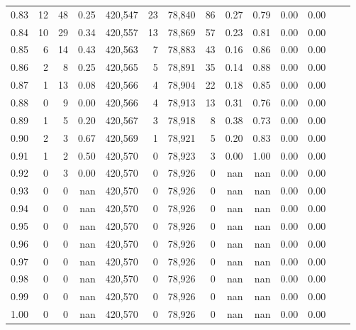 \begin{tabular}{rrrrrrrrrrrrrr}
0.83 &      12 &     48 &    0.25 &  420,547 &       23 &  78,840 &      86 &  0.27 &  0.79 &  0.00 &      0.00 \\
0.84 &      10 &     29 &    0.34 &  420,557 &       13 &  78,869 &      57 &  0.23 &  0.81 &  0.00 &      0.00 \\
0.85 &       6 &     14 &    0.43 &  420,563 &        7 &  78,883 &      43 &  0.16 &  0.86 &  0.00 &      0.00 \\
0.86 &       2 &      8 &    0.25 &  420,565 &        5 &  78,891 &      35 &  0.14 &  0.88 &  0.00 &      0.00 \\
0.87 &       1 &     13 &    0.08 &  420,566 &        4 &  78,904 &      22 &  0.18 &  0.85 &  0.00 &      0.00 \\
0.88 &       0 &      9 &    0.00 &  420,566 &        4 &  78,913 &      13 &  0.31 &  0.76 &  0.00 &      0.00 \\
0.89 &       1 &      5 &    0.20 &  420,567 &        3 &  78,918 &       8 &  0.38 &  0.73 &  0.00 &      0.00 \\
0.90 &       2 &      3 &    0.67 &  420,569 &        1 &  78,921 &       5 &  0.20 &  0.83 &  0.00 &      0.00 \\
0.91 &       1 &      2 &    0.50 &  420,570 &        0 &  78,923 &       3 &  0.00 &  1.00 &  0.00 &      0.00 \\
0.92 &       0 &      3 &    0.00 &  420,570 &        0 &  78,926 &       0 &   nan &   nan &  0.00 &      0.00 \\
0.93 &       0 &      0 &     nan &  420,570 &        0 &  78,926 &       0 &   nan &   nan &  0.00 &      0.00 \\
0.94 &       0 &      0 &     nan &  420,570 &        0 &  78,926 &       0 &   nan &   nan &  0.00 &      0.00 \\
0.95 &       0 &      0 &     nan &  420,570 &        0 &  78,926 &       0 &   nan &   nan &  0.00 &      0.00 \\
0.96 &       0 &      0 &     nan &  420,570 &        0 &  78,926 &       0 &   nan &   nan &  0.00 &      0.00 \\
0.97 &       0 &      0 &     nan &  420,570 &        0 &  78,926 &       0 &   nan &   nan &  0.00 &      0.00 \\
0.98 &       0 &      0 &     nan &  420,570 &        0 &  78,926 &       0 &   nan &   nan &  0.00 &      0.00 \\
0.99 &       0 &      0 &     nan &  420,570 &        0 &  78,926 &       0 &   nan &   nan &  0.00 &      0.00 \\
1.00 &       0 &      0 &     nan &  420,570 &        0 &  78,926 &       0 &   nan &   nan &  0.00 &      0.00 \\
\bottomrule
\end{tabular}
